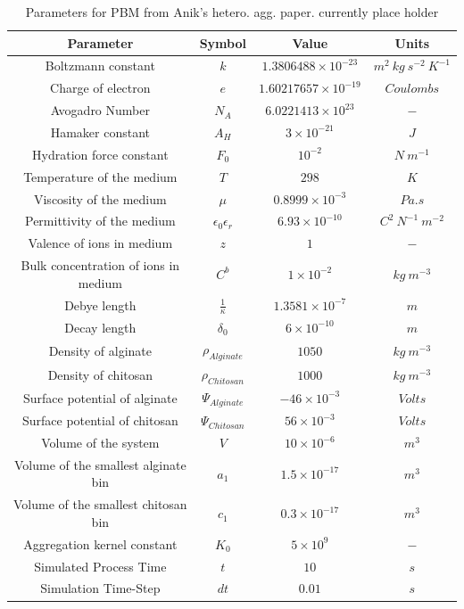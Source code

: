 \documentclass[preprint,11pt,authoryear]{elsarticle}
\begin{document}
	\begin{table}[!htb]
	\caption{Parameters for PBM from Anik's hetero. agg. paper. currently place holder} \label{table:mthds_pbm_parameters}
	\begin{center}
	\begin{tabular}{c|c|c|c}
	\hline
	\bf{Parameter} &\bf{Symbol} &\bf{Value} &\bf{Units}\\
	\hline
	Boltzmann constant & $k$ & $1.3806488 \times 10^{-23}$ & $m^2~kg~s^{-2}~K^{-1}$\\
	Charge of electron & $e$ & $1.60217657 \times 10^{-19}$ & $Coulombs$\\
	Avogadro Number & $N_A$ & $6.0221413 \times 10^{23}$ & $-$\\
	Hamaker constant & $A_H$ & $3 \times 10^{-21}$ & $J$\\
	Hydration force constant & $F_0$ & $10^{-2}$ & $N~m^{-1}$\\
	Temperature of the medium & $T$ & $298$ & $K$\\
	Viscosity of the medium & $\mu$ & $0.8999 \times 10^{-3}$ & $Pa.s$\\
	Permittivity of the medium & $\epsilon_0 \epsilon_r$ & $6.93\times 10^{-10}$ & $C^2~N^{-1}~m^{-2}$ \\
	Valence of ions in medium & $z$ & $1$ & $-$\\
	Bulk concentration of ions in medium & $C^b$ & $1 \times 10^{-2}$ & $kg~m^{-3}$\\
	Debye length & $\frac{1}{\kappa} $ & $1.3581 \times 10^{-7}$ & $m$\\
	Decay length & $\delta_0$ & $6 \times 10^{-10}$ & $m$\\
	Density of alginate & $\rho_{Alginate}$ & $1050$ & $kg~m^{-3}$ \\
	Density of chitosan & $\rho_{Chitosan}$ & $1000$ & $kg~m^{-3}$ \\
	Surface potential of alginate & $\Psi_{Alginate}$ & $-46 \times 10^{-3}$ & $Volts$\\
	Surface potential of chitosan & $\Psi_{Chitosan}$ & $56 \times 10^{-3}$ & $Volts$\\
	Volume of the system & $V$ & $10\times10^{-6}$ & $m^3$\\
	Volume of the smallest alginate bin & $a_1$ & $1.5 \times 10^{-17}$ & $m^{3}$\\
	Volume of the smallest chitosan bin & $c_1$ & $0.3 \times 10^{-17}$ & $m^{3}$ \\
	Aggregation kernel constant & $K_0$ & $5 \times 10^{9}$ & $-$\\
	Simulated Process Time & $t$ & $10$ & $s$\\
	Simulation Time-Step & $dt$ & $0.01$ & $s$\\
	\hline
	\end{tabular}
	\end{center}
	\end{table}
	
\end{document}
